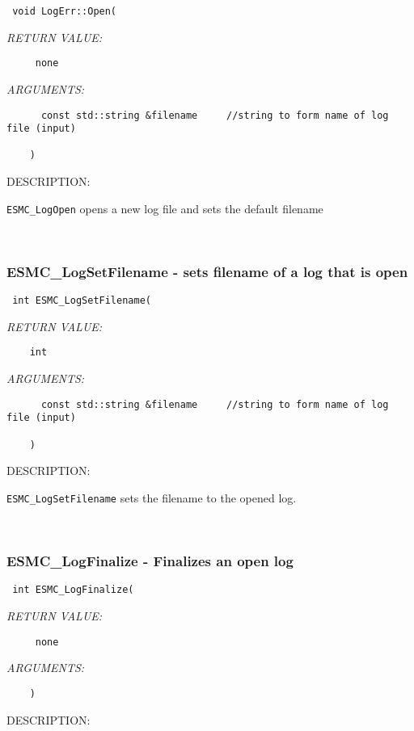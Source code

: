 {  
\begin{verbatim} 
 void LogErr::Open(\end{verbatim}{\em RETURN VALUE:}
\begin{verbatim}     none\end{verbatim}{\em ARGUMENTS:}
\begin{verbatim} 
      const std::string &filename     //string to form name of log file (input)
 
    )\end{verbatim}
{\sf DESCRIPTION:\\ }


   {\tt ESMC\_LogOpen} opens a new log file and sets the default filename
   
 
\mbox{}\hrulefill\ 
 
\subsubsection [ESMC\_LogSetFilename] {ESMC\_LogSetFilename - sets filename of a log that is open}


  
\begin{verbatim} int ESMC_LogSetFilename(\end{verbatim}{\em RETURN VALUE:}
\begin{verbatim}    int\end{verbatim}{\em ARGUMENTS:}
\begin{verbatim} 
      const std::string &filename     //string to form name of log file (input)
 
    )\end{verbatim}
{\sf DESCRIPTION:\\ }


   {\tt ESMC\_LogSetFilename} sets the filename to the opened log.
   
 
\mbox{}\hrulefill\ 
 
\subsubsection [ESMC\_LogFinalize] {ESMC\_LogFinalize - Finalizes an open log}


  
\begin{verbatim} int ESMC_LogFinalize(\end{verbatim}{\em RETURN VALUE:}
\begin{verbatim}     none\end{verbatim}{\em ARGUMENTS:}
\begin{verbatim} 
    )\end{verbatim}
{\sf DESCRIPTION:\\ }


}

